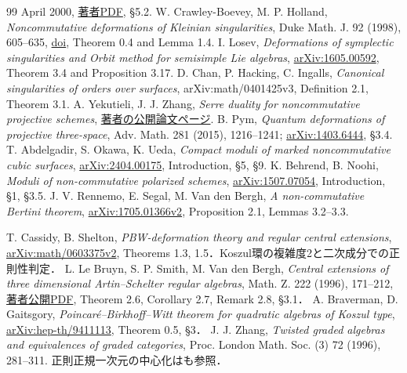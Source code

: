 \documentclass[11pt,a4paper]{ltjsarticle}
\theoremstyle{definition}\newtheorem{definition}[theorem]{定義}
\begin{document}
\begin{thebibliography}{99}
April 2000, \href{https://www.math.uni-bielefeld.de/~wcrawley/dmvlecs.pdf}{著者PDF}, \S5.2.
 W. Crawley-Boevey, M. P. Holland,
\emph{Noncommutative deformations of Kleinian singularities},
Duke Math. J. 92 (1998), 605--635,
\href{https://doi.org/10.1215/S0012-7094-98-09218-3}{doi}, Theorem 0.4 and Lemma 1.4.
 I. Losev,
\emph{Deformations of symplectic singularities and Orbit method for semisimple Lie algebras},
\href{https://arxiv.org/abs/1605.00592}{arXiv:1605.00592},
Theorem 3.4 and Proposition 3.17.
 D. Chan, P. Hacking, C. Ingalls,
\emph{Canonical singularities of orders over surfaces},
arXiv:math/0401425v3, Definition 2.1, Theorem 3.1.
 A. Yekutieli, J. J. Zhang,
\emph{Serre duality for noncommutative projective schemes},
\href{https://www.math.bgu.ac.il/~amyekut/publications/nc-serre/nc-serre.html}{著者の公開論文ページ}.
 B. Pym,
\emph{Quantum deformations of projective three-space},
Adv. Math. 281 (2015), 1216--1241;
\href{https://arxiv.org/abs/1403.6444}{arXiv:1403.6444}, \S3.4.
 T. Abdelgadir, S. Okawa, K. Ueda,
\emph{Compact moduli of marked noncommutative cubic surfaces},
\href{https://arxiv.org/abs/2404.00175}{arXiv:2404.00175}, Introduction, \S5, \S9.
 K. Behrend, B. Noohi,
\emph{Moduli of non-commutative polarized schemes},
\href{https://arxiv.org/abs/1507.07054}{arXiv:1507.07054}, Introduction, \S1, \S3.5.
 J. V. Rennemo, E. Segal, M. Van den Bergh,
\emph{A non-commutative Bertini theorem},
\href{https://arxiv.org/abs/1705.01366v2}{arXiv:1705.01366v2}, Proposition 2.1, Lemmas 3.2--3.3.

 T. Cassidy, B. Shelton,
\emph{PBW-deformation theory and regular central extensions},
\href{https://arxiv.org/abs/math/0603375}{arXiv:math/0603375v2},
Theorems 1.3, 1.5．Koszul環の複雑度2と二次成分での正則性判定．
 L. Le Bruyn, S. P. Smith, M. Van den Bergh,
\emph{Central extensions of three dimensional Artin--Schelter regular algebras},
Math. Z. 222 (1996), 171--212,
\href{https://sites.math.washington.edu/~smith/Research/Central-extns.pdf}{著者公開PDF},
Theorem 2.6, Corollary 2.7, Remark 2.8, \S3.1．
 A. Braverman, D. Gaitsgory,
\emph{Poincar\'e--Birkhoff--Witt theorem for quadratic algebras of Koszul type},
\href{https://arxiv.org/abs/hep-th/9411113}{arXiv:hep-th/9411113},
Theorem 0.5, \S3．
 J. J. Zhang,
\emph{Twisted graded algebras and equivalences of graded categories},
Proc. London Math. Soc. (3) 72 (1996), 281--311.
正則正規一次元の中心化は\cite[\S3.1]{LBS}も参照．


\end{thebibliography}
\end{document}
